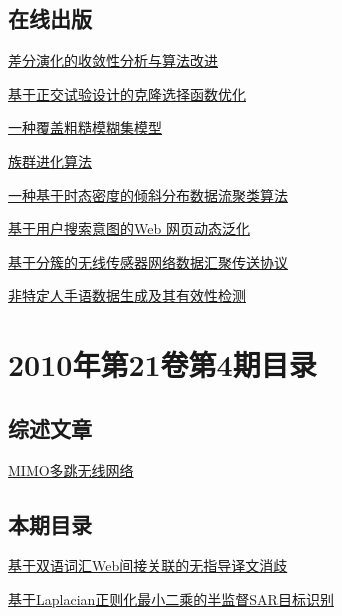 \documentclass[a4paper]{article}
\begin{document}
\subsection{在线出版}
\href{http://www.jos.org.cn/ch/reader/download_pdf.aspx?file_no=3486&year_id=2010&quarter_id=5&falg=1}{差分演化的收敛性分析与算法改进}

\href{http://www.jos.org.cn/ch/reader/download_pdf.aspx?file_no=3472&year_id=2010&quarter_id=5&falg=1}{基于正交试验设计的克隆选择函数优化}

\href{http://www.jos.org.cn/ch/reader/download_pdf.aspx?file_no=3624&year_id=2010&quarter_id=5&falg=1}{一种覆盖粗糙模糊集模型}

\href{http://www.jos.org.cn/ch/reader/download_pdf.aspx?file_no=3484&year_id=2010&quarter_id=5&falg=1}{族群进化算法}

\href{http://www.jos.org.cn/ch/reader/download_pdf.aspx?file_no=3470&year_id=2010&quarter_id=5&falg=1}{一种基于时态密度的倾斜分布数据流聚类算法}

\href{http://www.jos.org.cn/ch/reader/download_pdf.aspx?file_no=3477&year_id=2010&quarter_id=5&falg=1}{基于用户搜索意图的Web 网页动态泛化}

\href{http://www.jos.org.cn/ch/reader/download_pdf.aspx?file_no=3534&year_id=2010&quarter_id=5&falg=1}{基于分簇的无线传感器网络数据汇聚传送协议}

\href{http://www.jos.org.cn/ch/reader/download_pdf.aspx?file_no=3476&year_id=2010&quarter_id=5&falg=1}{非特定人手语数据生成及其有效性检测}


\section{\textbf{2010年第21卷第4期目录}}
\subsection{综述文章}
\href{http://www.jos.org.cn/ch/reader/download_pdf.aspx?file_no=3708&year_id=2010&quarter_id=4&falg=1}{MIMO多跳无线网络}

\subsection{本期目录}
\href{http://www.jos.org.cn/ch/reader/download_pdf.aspx?file_no=3574&year_id=2010&quarter_id=4&falg=1}{基于双语词汇Web间接关联的无指导译文消歧}

\href{http://www.jos.org.cn/ch/reader/download_pdf.aspx?file_no=3538&year_id=2010&quarter_id=4&falg=1}{基于Laplacian正则化最小二乘的半监督SAR目标识别}
\end{document}
